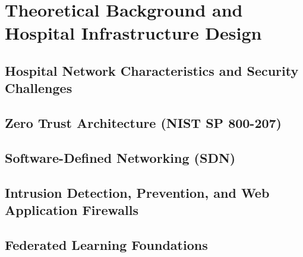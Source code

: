 \chapter{Theoretical Background and Hospital Infrastructure Design}
\label{ch:theoretical_background}


\section{Hospital Network Characteristics and Security Challenges}
\label{sec:hospital_challenges}

\section{Zero Trust Architecture (NIST SP 800-207)}
\label{sec:zta_theory}

\section{Software-Defined Networking (SDN)}
\label{sec:sdn_theory}

\section{Intrusion Detection, Prevention, and Web Application Firewalls}
\label{sec:ids_waf_theory}

\section{Federated Learning Foundations}
\label{sec:fl_theory}

